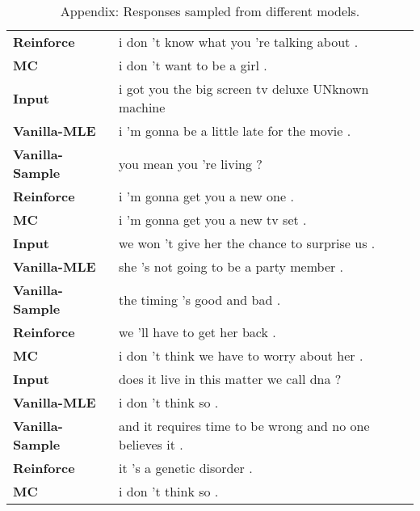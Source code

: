 \documentclass[11pt]{article}
\begin{document}
\begin{table*}[!htb]
\begin{tabular}{p{4cm}p{8cm}}
{\bf Reinforce}&i don 't know what you 're talking about .\\
{\bf MC}&i don 't want to be a girl .\\\hline
{\bf Input}&i got you the big screen tv deluxe UNknown machine\\
{\bf Vanilla-MLE}&i 'm gonna be a little late for the movie .\\
{\bf Vanilla-Sample}&you mean you 're living ?\\
{\bf Reinforce}&i 'm gonna get you a new one .\\
{\bf MC}&i 'm gonna get you a new tv set .\\\hline
{\bf Input}&we won 't give her the chance to surprise us .\\
{\bf Vanilla-MLE}&she 's not going to be a party member .\\
{\bf Vanilla-Sample}&the timing 's good and bad .\\
{\bf Reinforce}&we 'll have to get her back .\\
{\bf MC}&i don 't think we have to worry about her .\\\hline
{\bf Input}&does it live in this matter we call dna ?\\
{\bf Vanilla-MLE}&i don 't think so .\\
{\bf Vanilla-Sample}&and it requires time to be wrong and no one believes it .\\
{\bf Reinforce}&it 's a genetic disorder .\\
{\bf MC}&i don 't think so .\\\hline
\end{tabular}
\caption{Appendix: Responses sampled from different models.}
\label{example-appendix1}
\end{table*}
\end{document}
